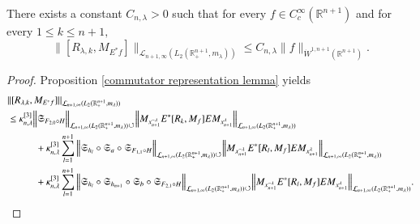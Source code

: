 \documentclass[12pt]{amsart}
\begin{document}
\begin{lemma}\label{mta final lemma} There exists a constant $C_{n,\lambda}>0$ such that for every $f\in C^{\infty}_c(\mathbb{R}^{n+1})$ and for every $1\leq k\leq n+1,$
$$\|[R_{\lambda,k},M_{E^{\ast}f}]\|_{\mathcal{L}_{n+1,\infty}(L_2(\mathbb{R}^{n+1}_+,m_{\lambda}))}\leq C_{n,\lambda}\|f\|_{\dot{W}^{1,n+1}(\mathbb{R}^{n+1})}.$$
\end{lemma}
\begin{proof} Proposition \ref{commutator representation lemma} yields
\begin{align*}
&\|[R_{\lambda,k},M_{E^{\ast}f}]\|_{\mathcal{L}_{n+1,\infty}(L_2(\mathbb{R}^{n+1}_+,m_{\lambda}))}\\
&\leq \kappa_{n,\lambda}^{[3]}\Big\|\mathfrak{S}_{F_{2,0}\circ H}\Big\|_{\mathcal{L}_{n+1,\infty}(L_2(\mathbb{R}^{n+1}_+,m_{\lambda}))\circlearrowleft}\Big\| M_{x_{n+1}^{-\lambda}} E^{\ast}[R_k,M_f]E M_{x_{n+1}^{\lambda}}\Big\|_{\mathcal{L}_{n+1,\infty}(L_2(\mathbb{R}^{n+1}_+,m_{\lambda}))}\\
&\hspace{1.0cm}+\kappa_{n,\lambda}^{[3]}\sum_{l=1}^{n+1}\Big\|\mathfrak{S}_{h_l}\circ\mathfrak{S}_a\circ\mathfrak{S}_{F_{1,1}\circ H}\Big\|_{\mathcal{L}_{n+1,\infty}(L_2(\mathbb{R}^{n+1}_+,m_{\lambda}))\circlearrowleft}\Big\|M_{x_{n+1}^{-\lambda}} E^{\ast}[R_l,M_f]E M_{x_{n+1}^{\lambda}}\Big\|_{\mathcal{L}_{n+1,\infty}(L_2(\mathbb{R}^{n+1}_+,m_{\lambda}))}\\
&\hspace{1.0cm}+\kappa_{n,\lambda}^{[3]}\sum_{l=1}^{n+1}\Big\|\mathfrak{S}_{h_l}\circ\mathfrak{S}_{h_{n+1}}\circ\mathfrak{S}_b\circ\mathfrak{S}_{F_{2,1}\circ H}\Big\|_{\mathcal{L}_{n+1,\infty}(L_2(\mathbb{R}^{n+1}_+,m_{\lambda}))\circlearrowleft}\Big\|M_{x_{n+1}^{-\lambda}} E^{\ast}[R_l,M_f]E M_{x_{n+1}^{\lambda}}\Big\|_{\mathcal{L}_{n+1,\infty}(L_2(\mathbb{R}^{n+1}_+,m_{\lambda}))}.
\end{align*}

\end{proof}
\end{document}
